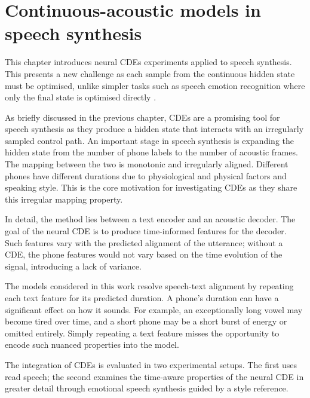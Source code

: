 \chapter{Continuous-acoustic models in speech synthesis}

This chapter introduces neural \acp{CDE} experiments applied to speech synthesis. This presents a new challenge as each sample from the continuous hidden state must be optimised, unlike simpler tasks such as speech emotion recognition where only the final state is optimised directly \citep{ni2025speechemotioncde}.

As briefly discussed in the previous chapter, \acp{CDE} are a promising tool for speech synthesis as they produce a hidden state that interacts with an irregularly sampled control path. An important stage in speech synthesis is expanding the hidden state from the number of phone labels to the number of acoustic frames. The mapping between the two is monotonic and irregularly aligned. Different phones have different durations due to physiological and physical factors and speaking style. This is the core motivation for investigating \acp{CDE} as they share this irregular mapping property.

In detail, the method lies between a text encoder and an acoustic decoder. The goal of the neural \ac{CDE} is to produce time-informed features for the decoder. Such features vary with the predicted alignment of the utterance; without a \ac{CDE}, the phone features would not vary based on the time evolution of the signal, introducing a lack of variance.

The models considered in this work resolve speech-text alignment by repeating each text feature for its predicted duration. A phone's duration can have a significant effect on how it sounds. For example, an exceptionally long vowel may become tired over time, and a short phone may be a short burst of energy or omitted entirely. Simply repeating a text feature misses the opportunity to encode such nuanced properties into the model.

The integration of \acp{CDE} is evaluated in two experimental setups. The first uses read speech; the second examines the time-aware properties of the neural \ac{CDE} in greater detail through emotional speech synthesis guided by a style reference.

